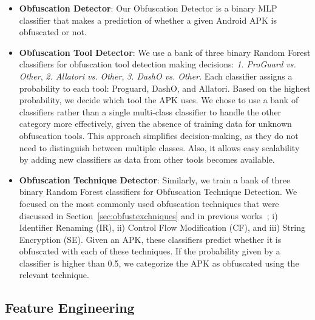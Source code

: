 \begin{itemize}
    \item \textbf{Obfuscation Detector}: Our Obfuscation Detector is a binary MLP classifier that makes a prediction of whether a given Android APK is obfuscated or not. 


    \item \textbf{Obfuscation Tool Detector}: We use a bank of three binary Random Forest classifiers for obfuscation tool detection making decisions: \textit{1. ProGuard vs. Other}, \textit{2. Allatori vs. Other}, \textit{3. DashO vs. Other}.
    Each classifier assigns a probability to each tool: Proguard, DashO, and Allatori. Based on the highest probability, we decide which tool the APK uses. We chose to use a bank of classifiers rather than a single multi-class classifier to handle the other category more effectively, given the absence of training data for unknown obfuscation tools. This approach simplifies decision-making, as they do not need to distinguish between multiple classes. Also, it allows easy scalability by adding new classifiers as data from other tools becomes available.

    \item \textbf{Obfuscation Technique Detector}: Similarly, we train a bank of three binary Random Forest classifiers for Obfuscation Technique Detection. We focused on the most commonly used obfuscation techniques that were discussed in Section~\ref{sec:obfustexchniques} and in previous works~\cite{zhang2021android, conti2022obfuscation, guo2022survey, dong2018understanding, wermke2018large}; i) Identifier Renaming (IR), ii) Control Flow Modification (CF), and iii) String Encryption (SE). Given an APK, these classifiers predict whether it is obfuscated with each of these techniques. If the probability given by a classifier is higher than 0.5, we categorize the APK as obfuscated using the relevant technique. 
    
    
\end{itemize}

\subsection{Feature Engineering}
\label{sec:features}

